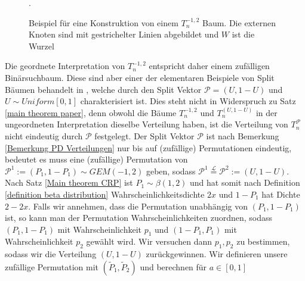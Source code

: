 \usetikzlibrary{shapes.geometric}
\begin{figure}[h!]
\begin{center}
\caption{\label{picture binary trees}Beispiel für eine Konstruktion von einem $T_n^{-1,2}$ Baum. Die externen Knoten sind mit gestrichelter Linien abgebildet und $W$ ist die Wurzel}.
\end{center}
\end{figure}
Die geordnete Interpretation von $T_n^{-1,2}$ entspricht daher einem zufälligen Binärsuchbaum. Diese sind aber einer der elementaren Beispiele von Split Bäumen behandelt in \cite{devroye1998universal}, welche durch den Split Vektor $\mathcal{P} = (U,1-U)$ und $U \sim Uniform[0,1]$ charakterisiert ist. Dies steht nicht in Widerspruch zu Satz \ref{main theorem paper}, denn obwohl die Bäume $T_n^{-1,2}$ und $T_n^{(U,1-U)}$ in der ungeordneten Interpretation dieselbe Verteilung haben, ist die Verteilung von $T_n^{\mathcal{P}}$ nicht eindeutig durch $\mathcal{P}$ festgelegt. Der Split Vektor $\mathcal{P}$ ist nach Bemerkung \ref{Bemerkung PD Verteilungen} nur bis auf (zufällige) Permutationen eindeutig, bedeutet es muss eine (zufällige) Permutation von $\mathcal{P}^1 := (P_1,1-P_1) \sim GEM(-1,2)$ geben, sodass $\mathcal{P}^1 \stackrel{\mathcal{L}}{=} \mathcal{P}^2 := (U,1-U)$. Nach Satz \ref{Main theorem CRP} ist $P_1 \sim \beta(1,2)$ und hat somit nach Definition \ref{definition beta distribution} Wahrscheinlichkeitsdichte $2x$ und $1-P_1$ hat Dichte $2-2x$. Falls wir annehmen, dass die Permutation unabhängig von $(P_1,1-P_1)$ ist, so kann man der Permutation Wahrscheinlichkeiten zuordnen, sodass $(P_1,1-P_1)$ mit Wahrscheinlichkeit $p_1$ und $(1-P_1,P_1)$ mit Wahrscheinlichkeit $p_2$ gewählt wird. Wir versuchen dann $p_1,p_2$ zu bestimmen, sodass wir die Verteilung $(U,1-U)$ zurückgewinnen. Wir definieren unsere zufällige Permutation mit $(\tilde{P}_1,\tilde{P}_2)$ und berechnen für $a \in [0,1]$
